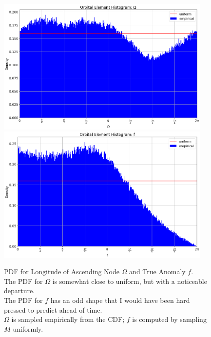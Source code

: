 \begin{figure}[hbt!]
\begin{center}
\includegraphics[width=0.95\textwidth]{../figs/elts/elt_hist_Omega_node.png}
\includegraphics[width=0.95\textwidth]{../figs/elts/elt_hist_f.png}
\end{center}
\caption[PDF for Longitude of Ascending Node $\Omega$ and True Anomaly $f$]
{PDF for Longitude of Ascending Node $\Omega$ and True Anomaly $f$.\\ 
The PDF for $\Omega$ is somewhat close to uniform, but with a noticeable departure.\\
The PDF for $f$ has an odd shape that I would have been hard pressed to predict ahead of time.\\
$\Omega$ is sampled empirically from the CDF; $f$ is computed by sampling $M$ uniformly.}
\label{fig:elt_dist_Omega_f}
\end{figure}
\clearpage

